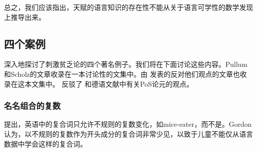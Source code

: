 总之，我们应该指出，天赋的语言知识的存在性不能从关于语言可学性的数学发现上推导出来。 

\subsection{四个案例}
\label{PSA-cases}

\mbox{} \citet{PS2002a}深入地探讨了刺激贫乏论的四个著名例子。我们将在下面讨论这些内容。Pullum和Scholz的文章收录在一本讨论性的文集中。由 \citet{SP2002b}发表的反对他们观点的文章也收录在这本文集中。 \citet{Eisenberg92b}反驳了 \citet{Chomsky86}和德语文献中有关PoS论元的观点。

\subsubsection{名名组合的复数}

\mbox{} \citet{Gordon86a}提出，英语中的复合词只允许不规则的复数变化，如mice-eater，而不是。Gordon认为，以不规则的复数作为开头成分的复合词非常少见，以致于儿童不能仅从语言数据中学会这样的复合词。

